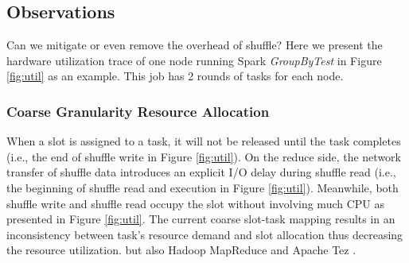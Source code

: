 \subsection{Observations} \label{observation}
Can we mitigate or even remove the overhead of shuffle? 
Here we present the hardware utilization trace of one node running Spark \textit{GroupByTest} in Figure \ref{fig:util} as an example. 
This job has 2 rounds of tasks for each node.
\subsubsection{Coarse Granularity Resource Allocation}
When a slot is assigned to a task, it will not be released until the task completes (i.e., the end of shuffle write in Figure \ref{fig:util}). 
On the reduce side, the network transfer of shuffle data introduces an explicit I/O delay during shuffle read (i.e., the beginning of shuffle read and execution in Figure \ref{fig:util}). 
Meanwhile, both shuffle write and shuffle read occupy the slot without involving much CPU as presented in Figure \ref{fig:util}. 
The current coarse slot-task mapping results in an inconsistency between task's resource demand and slot allocation thus decreasing the resource utilization. 
 \cite{apachespark} but also Hadoop MapReduce \cite{hadoop} and Apache Tez \cite{tez}. 

